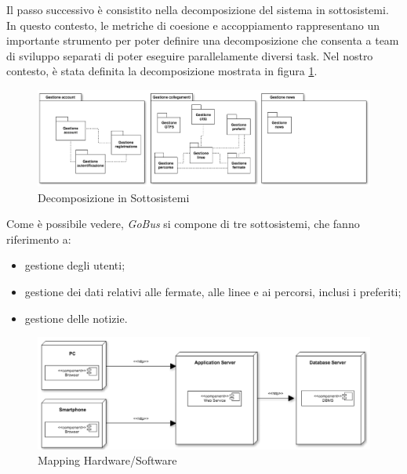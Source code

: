 Il passo successivo \`{e} consistito nella decomposizione del sistema in sottosistemi. In questo contesto, le metriche di coesione e accoppiamento rappresentano un importante strumento per poter definire una decomposizione che consenta a team di sviluppo separati di poter eseguire parallelamente diversi task. Nel nostro contesto, \`{e} stata definita la decomposizione mostrata in figura \ref{fig:sd}.

\begin{figure}[tb]
\centering
\includegraphics[scale=.4]{img/sd.png}
\caption{Decomposizione in Sottosistemi}
\label{fig:sd}
\end{figure} 

Come \`{e} possibile vedere, \emph{GoBus} si compone di tre sottosistemi, che fanno riferimento a:
\begin{itemize}
\item gestione degli utenti;
\item gestione dei dati relativi alle fermate, alle linee e ai percorsi, inclusi i preferiti;
\item gestione delle notizie.
\end{itemize}

\begin{figure}[tb]
\centering
\includegraphics[scale=.4]{img/mhs.png}
\caption{Mapping Hardware/Software}
\label{fig:mhs}
\end{figure} 

